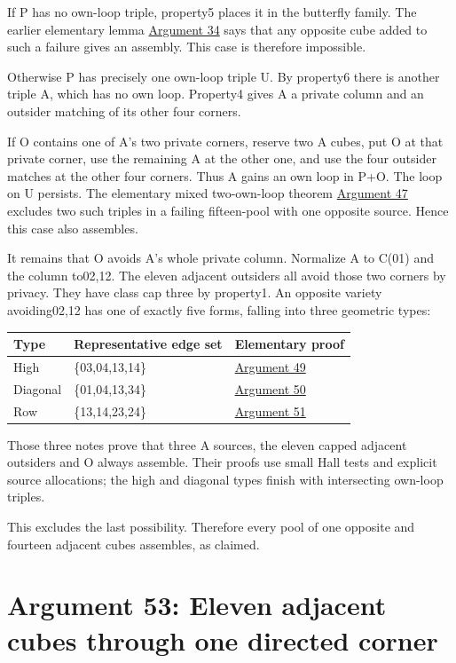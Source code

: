\documentclass[
  10pt,
]{article}
\begin{document}
If P has no own-loop triple, property5 places it in the butterfly
family. The earlier elementary lemma \protect\hyperlink{arg-34}{Argument
34} says that any opposite cube added to such a failure gives an
assembly. This case is therefore impossible.

Otherwise P has precisely one own-loop triple U. By property6 there is
another triple A, which has no own loop. Property4 gives A a private
column and an outsider matching of its other four corners.

If O contains one of A's two private corners, reserve two A cubes, put O
at that private corner, use the remaining A at the other one, and use
the four outsider matches at the other four corners. Thus A gains an own
loop in P+O. The loop on U persists. The elementary mixed two-own-loop
theorem \protect\hyperlink{arg-47}{Argument 47} excludes two such
triples in a failing fifteen-pool with one opposite source. Hence this
case also assembles.

It remains that O avoids A's whole private column. Normalize A to C(01)
and the column to02,12. The eleven adjacent outsiders all avoid those
two corners by privacy. They have class cap three by property1. An
opposite variety avoiding02,12 has one of exactly five forms, falling
into three geometric types:

\begin{longtable}[]{@{}lll@{}}
\toprule\noalign{}
Type & Representative edge set & Elementary proof \\
\midrule\noalign{}
\endhead
\bottomrule\noalign{}
\endlastfoot
High & \{03,04,13,14\} & \protect\hyperlink{arg-49}{Argument 49} \\
Diagonal & \{01,04,13,34\} & \protect\hyperlink{arg-50}{Argument 50} \\
Row & \{13,14,23,24\} & \protect\hyperlink{arg-51}{Argument 51} \\
\end{longtable}

Those three notes prove that three A sources, the eleven capped adjacent
outsiders and O always assemble. Their proofs use small Hall tests and
explicit source allocations; the high and diagonal types finish with
intersecting own-loop triples.

This excludes the last possibility. Therefore every pool of one opposite
and fourteen adjacent cubes assembles, as claimed.

\hypertarget{arg-53}{%
\section{Argument 53: Eleven adjacent cubes through one directed
corner}\label{arg-53}}
\end{document}
